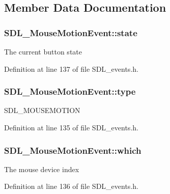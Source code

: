 \subsection{Member Data Documentation}
\hypertarget{struct_s_d_l___mouse_motion_event_a10434904d352c7165b9de5685d10dda6}{}
\subsubsection[{state}]{ S\+D\+L\+\_\+\+Mouse\+Motion\+Event\+::state}\label{struct_s_d_l___mouse_motion_event_a10434904d352c7165b9de5685d10dda6}
The current button state 

Definition at line 137 of file S\+D\+L\+\_\+events.\+h.

\hypertarget{struct_s_d_l___mouse_motion_event_ab5d4d8bef3b1a6f34429024b7aecf682}{}
\subsubsection[{type}]{ S\+D\+L\+\_\+\+Mouse\+Motion\+Event\+::type}\label{struct_s_d_l___mouse_motion_event_ab5d4d8bef3b1a6f34429024b7aecf682}
S\+D\+L\+\_\+\+M\+O\+U\+S\+E\+M\+O\+T\+I\+O\+N 

Definition at line 135 of file S\+D\+L\+\_\+events.\+h.

\hypertarget{struct_s_d_l___mouse_motion_event_a7ea0004baf91d3b4572cdaadd35474c5}{}
\subsubsection[{which}]{ S\+D\+L\+\_\+\+Mouse\+Motion\+Event\+::which}\label{struct_s_d_l___mouse_motion_event_a7ea0004baf91d3b4572cdaadd35474c5}
The mouse device index 

Definition at line 136 of file S\+D\+L\+\_\+events.\+h.

\hypertarget{struct_s_d_l___mouse_motion_event_abf5b246feb0afbcabcef22b924eda8c3}{}
